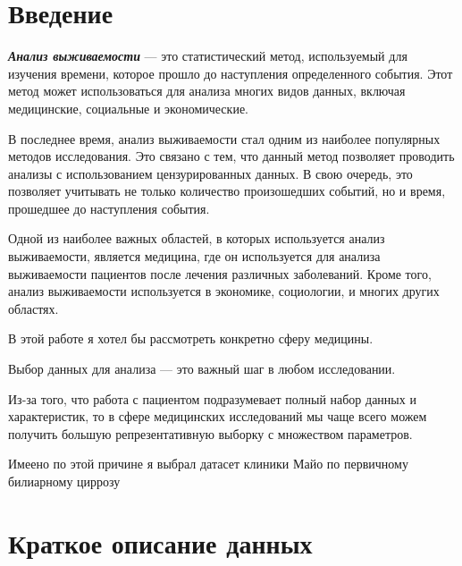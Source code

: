 \documentclass[
  11pt,
]{article}
\author{}
\date{\vspace{-2.5em}}
\begin{document}




\tableofcontents

\pagebreak

\hypertarget{ux432ux432ux435ux434ux435ux43dux438ux435}{%
\section{Введение}\label{ux432ux432ux435ux434ux435ux43dux438ux435}}

\textbf{\emph{Анализ выживаемости}} --- это статистический метод,
используемый для изучения времени, которое прошло до наступления
определенного события. Этот метод может использоваться для анализа
многих видов данных, включая медицинские, социальные и экономические.

В последнее время, анализ выживаемости стал одним из наиболее популярных
методов исследования. Это связано с тем, что данный метод позволяет
проводить анализы с использованием цензурированных данных. В свою
очередь, это позволяет учитывать не только количество произошедших
событий, но и время, прошедшее до наступления события.

Одной из наиболее важных областей, в которых используется анализ
выживаемости, является медицина, где он используется для анализа
выживаемости пациентов после лечения различных заболеваний. Кроме того,
анализ выживаемости используется в экономике, социологии, и многих
других областях.

В этой работе я хотел бы рассмотреть конкретно сферу медицины.

Выбор данных для анализа --- это важный шаг в любом исследовании.

Из-за того, что работа с пациентом подразумевает полный набор данных и
характеристик, то в сфере медицинских исследований мы чаще всего можем
получить большую репрезентативную выборку с множеством параметров.

Имеено по этой причине я выбрал датасет клиники Майо по первичному
билиарному циррозу

\hypertarget{ux43aux440ux430ux442ux43aux43eux435-ux43eux43fux438ux441ux430ux43dux438ux435-ux434ux430ux43dux43dux44bux445}{%
\section{Краткое описание
данных}\label{ux43aux440ux430ux442ux43aux43eux435-ux43eux43fux438ux441ux430ux43dux438ux435-ux434ux430ux43dux43dux44bux445}}
\end{document}
